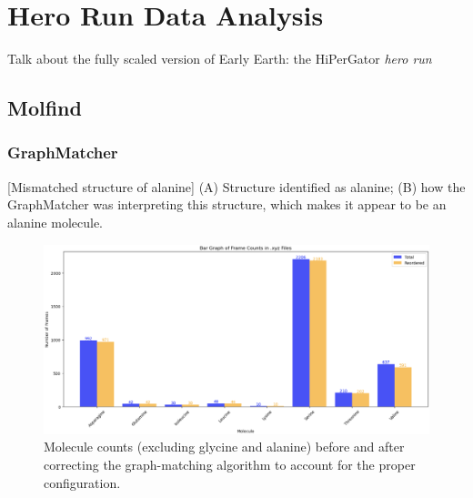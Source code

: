 \chapter{Hero Run Data Analysis} 
\label{chapter5}

Talk about the fully scaled version of Early Earth: the HiPerGator \textit{hero run}

\section{Molfind}
\label{sec:molfind}

\subsection{GraphMatcher}
\label{subsec:molfind_graphmatcher}

\begin{flushleft}
\begin{multiFigure}
[Mismatched structure of alanine]{
(A) Structure identified as alanine; 
(B) how the GraphMatcher was interpreting this structure, which makes it appear to be an alanine molecule.}
\label{fig:mismatched_alanine}
\end{multiFigure}
\end{flushleft}

\begin{figure}[!ht]
    \centering
    \includegraphics[width=1\linewidth]{Images/early_earth/remake_graph_matching.png}
    \caption[Molecules identified incorrectly in the initial search]{Molecule counts (excluding glycine and alanine) before and after correcting the graph-matching algorithm to account for the proper configuration.}
    \label{fig:graph_matching}
\end{figure}{}

